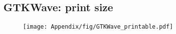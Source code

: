 \subsection{GTKWave: print size}
\label{app:GTKWave}

\begin{figure}[H]
    \centering
    \texttt{[image: Appendix/fig/GTKWave\_printable.pdf]}
    \label{fig:GTKWave_printable}
\end{figure}